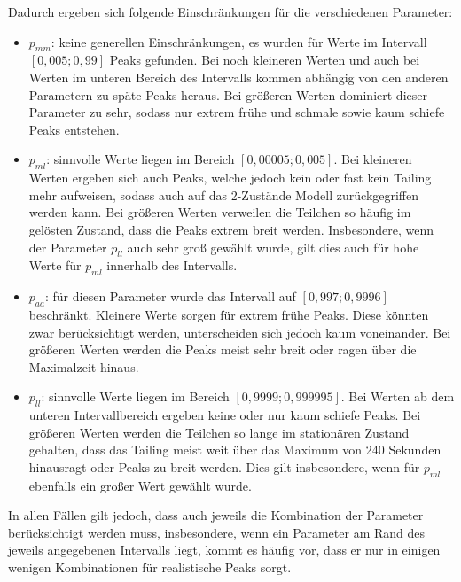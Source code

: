 Dadurch ergeben sich folgende Einschränkungen für die verschiedenen Parameter:
\begin{itemize}
 \item $p_{mm}$: keine generellen Einschränkungen, es wurden für Werte im Intervall $[0,005; 0,99]$ Peaks gefunden. Bei noch kleineren Werten und auch bei Werten im unteren Bereich des Intervalls kommen abhängig von den anderen Parametern zu späte Peaks heraus. Bei größeren Werten dominiert dieser Parameter zu sehr, sodass nur extrem frühe und schmale sowie kaum schiefe Peaks entstehen.
 \item $p_{ml}$: sinnvolle Werte liegen im Bereich $[0,00005; 0,005]$. Bei kleineren Werten ergeben sich auch Peaks, welche jedoch kein oder fast kein Tailing mehr aufweisen, sodass auch auf das 2-Zustände Modell zurückgegriffen werden kann. Bei größeren Werten verweilen die Teilchen so häufig im gelösten Zustand, dass die Peaks extrem breit werden. Insbesondere, wenn der Parameter $p_{ll}$ auch sehr groß gewählt wurde, gilt dies auch für hohe Werte für $p_{ml}$ innerhalb des Intervalls.
 \item $p_{aa}$: für diesen Parameter wurde das Intervall auf $[0,997; 0,9996]$ beschränkt. Kleinere Werte sorgen für extrem frühe Peaks. Diese könnten zwar berücksichtigt werden, unterscheiden sich jedoch kaum voneinander. Bei größeren Werten werden die Peaks meist sehr breit oder ragen über die Maximalzeit hinaus. 
 \item $p_{ll}$: sinnvolle Werte liegen im Bereich $[0,9999; 0,999995]$. Bei Werten ab dem unteren Intervallbereich ergeben keine oder nur kaum schiefe Peaks. Bei größeren Werten werden die Teilchen so lange im stationären Zustand gehalten, dass das Tailing meist weit über das Maximum von 240 Sekunden hinausragt oder Peaks zu breit werden. Dies gilt insbesondere, wenn für $p_{ml}$ ebenfalls ein großer Wert gewählt wurde. 
\end{itemize}

In allen Fällen gilt jedoch, dass auch jeweils die Kombination der Parameter berücksichtigt werden muss, insbesondere, wenn ein Parameter am Rand des jeweils angegebenen Intervalls liegt, kommt es häufig vor, dass er nur in einigen wenigen Kombinationen für realistische Peaks sorgt.



